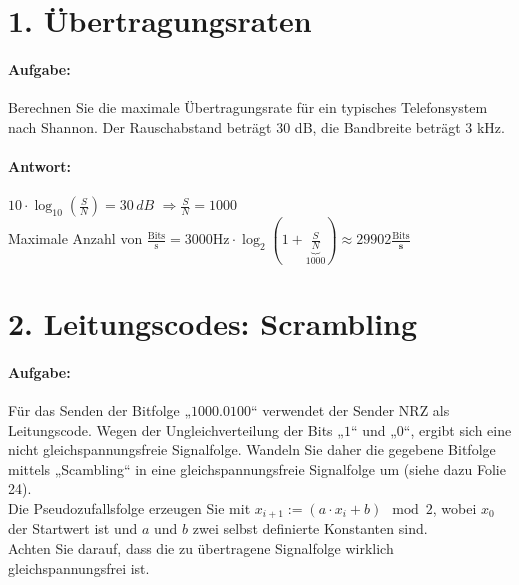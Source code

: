 \section{1. Übertragungsraten}
\paragraph{Aufgabe:}

	 Berechnen Sie die maximale Übertragungsrate für ein typisches Telefonsystem nach Shannon. Der Rauschabstand beträgt 30 dB, die Bandbreite beträgt 3 kHz.

\paragraph{Antwort:}

	$10 \cdot \log_{10}(\frac{S}{N})=30\, dB$
	 $\Longrightarrow \frac{S}{N} = 1000$
	\\Maximale Anzahl von $\frac{\text{Bits}}{\text{s}} =3000\text{Hz} \cdot \log_{2}(1+\underbrace{\frac{S}{N}}_\text{1000})  \approx 29902 \frac{\text{Bits}}{\textbf{s}}$


\section{2. Leitungscodes: Scrambling}
\paragraph{Aufgabe:}
		Für das Senden der Bitfolge „$1000.0100$“ verwendet der Sender NRZ als Leitungscode. Wegen der Ungleichverteilung der Bits „$1$“ und „$0$“, ergibt sich eine nicht gleichspannungsfreie Signalfolge.
		Wandeln Sie daher die gegebene Bitfolge mittels „Scambling“ in eine gleichspannungsfreie Signalfolge um (siehe dazu Folie 24).\\
		Die Pseudozufallsfolge erzeugen Sie mit $x_{i+1} := (a \cdot x_i+ b) \mod 2$, wobei $x_0$ der Startwert ist und $a$ und $b$ zwei selbst definierte Konstanten sind. \\
		Achten Sie darauf, dass die zu übertragene Signalfolge wirklich gleichspannungsfrei ist.
